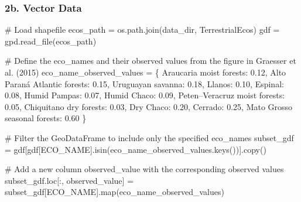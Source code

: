 \documentclass[
  letterpaper,
]{article}
\newenvironment{Shaded}{\begin{snugshade}}{\end{snugshade}}
\newcommand{\BuiltInTok}[1]{\textcolor[rgb]{0.00,0.23,0.31}{#1}}
\newcommand{\CommentTok}[1]{\textcolor[rgb]{0.37,0.37,0.37}{#1}}
\newcommand{\FloatTok}[1]{\textcolor[rgb]{0.68,0.00,0.00}{#1}}
\newcommand{\NormalTok}[1]{\textcolor[rgb]{0.00,0.23,0.31}{#1}}
\newcommand{\OperatorTok}[1]{\textcolor[rgb]{0.37,0.37,0.37}{#1}}
\newcommand{\StringTok}[1]{\textcolor[rgb]{0.13,0.47,0.30}{#1}}
\begin{document}
\subsubsection{2b. Vector Data}\label{b.-vector-data}

\begin{Shaded}
\begin{Highlighting}[]
\CommentTok{\# Load shapefile}
\NormalTok{ecos\_path }\OperatorTok{=}\NormalTok{ os.path.join(data\_dir, }\StringTok{\textquotesingle{}TerrestrialEcos\textquotesingle{}}\NormalTok{)}
\NormalTok{gdf }\OperatorTok{=}\NormalTok{ gpd.read\_file(ecos\_path)}

\CommentTok{\# Define the eco\_names and their observed values from the figure in Graesser et al. (2015)}
\NormalTok{eco\_name\_observed\_values }\OperatorTok{=}\NormalTok{ \{}
    \StringTok{\textquotesingle{}Araucaria moist forests\textquotesingle{}}\NormalTok{: }\FloatTok{0.12}\NormalTok{,}
    \StringTok{\textquotesingle{}Alto Paraná Atlantic forests\textquotesingle{}}\NormalTok{: }\FloatTok{0.15}\NormalTok{,}
    \StringTok{\textquotesingle{}Uruguayan savanna\textquotesingle{}}\NormalTok{: }\FloatTok{0.18}\NormalTok{,}
    \StringTok{\textquotesingle{}Llanos\textquotesingle{}}\NormalTok{: }\FloatTok{0.10}\NormalTok{,}
    \StringTok{\textquotesingle{}Espinal\textquotesingle{}}\NormalTok{: }\FloatTok{0.08}\NormalTok{,}
    \StringTok{\textquotesingle{}Humid Pampas\textquotesingle{}}\NormalTok{: }\FloatTok{0.07}\NormalTok{,}
    \StringTok{\textquotesingle{}Humid Chaco\textquotesingle{}}\NormalTok{: }\FloatTok{0.09}\NormalTok{,}
    \StringTok{\textquotesingle{}Peten–Veracruz moist forests\textquotesingle{}}\NormalTok{: }\FloatTok{0.05}\NormalTok{,}
    \StringTok{\textquotesingle{}Chiquitano dry forests\textquotesingle{}}\NormalTok{: }\FloatTok{0.03}\NormalTok{,}
    \StringTok{\textquotesingle{}Dry Chaco\textquotesingle{}}\NormalTok{: }\FloatTok{0.20}\NormalTok{,}
    \StringTok{\textquotesingle{}Cerrado\textquotesingle{}}\NormalTok{: }\FloatTok{0.25}\NormalTok{,}
    \StringTok{\textquotesingle{}Mato Grosso seasonal forests\textquotesingle{}}\NormalTok{: }\FloatTok{0.60}
\NormalTok{\}}

\CommentTok{\# Filter the GeoDataFrame to include only the specified eco\_names}
\NormalTok{subset\_gdf }\OperatorTok{=}\NormalTok{ gdf[gdf[}\StringTok{\textquotesingle{}ECO\_NAME\textquotesingle{}}\NormalTok{].isin(eco\_name\_observed\_values.keys())].copy()}

\CommentTok{\# Add a new column \textquotesingle{}observed\_value\textquotesingle{} with the corresponding observed values}
\NormalTok{subset\_gdf.loc[:, }\StringTok{\textquotesingle{}observed\_value\textquotesingle{}}\NormalTok{] }\OperatorTok{=}\NormalTok{ subset\_gdf[}\StringTok{\textquotesingle{}ECO\_NAME\textquotesingle{}}\NormalTok{].}\BuiltInTok{map}\NormalTok{(eco\_name\_observed\_values)}


\end{Highlighting}
\end{Shaded}
\end{document}
